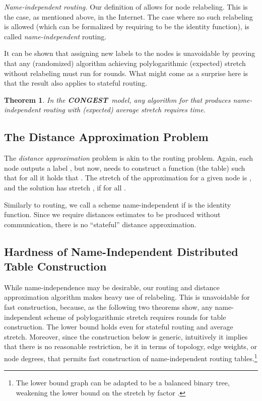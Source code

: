 \documentclass[letterpaper,11pt]{article}
\newtheorem{theorem}{Theorem}[section]
\newcommand{\CONGEST}{\textbf{CONGEST}}
\begin{document}
\emph{Name-independent routing.} Our definition of  allows for node
relabeling. This is the case, as mentioned above, in the Internet. The case
where no such relabeling is allowed (which can be formalized by requiring
 to be the identity function), is called \emph{name-independent}
routing.

It can be shown that assigning new labels to the nodes is unavoidable by proving
that any (randomized) algorithm achieving polylogarithmic (expected) stretch
without relabeling must run for  rounds. What might come as a
surprise here is that the result also applies to stateful routing.
\begin{theorem}
In the \CONGEST\ model, any algorithm for  that produces
name-independent routing with (expected) average stretch  requires
 time.
\end{theorem}



\subsection{The Distance Approximation Problem}

The \emph{distance approximation} problem is akin to the routing problem. Again,
each node  outputs a label , but now,  needs to construct a
function  (the table) such that for all
 it holds that . The stretch of the
approximation for a given node  is , and the
solution has stretch , if  for
all .

Similarly to routing, we call a scheme name-independent if 
is the identity function. Since we require distances estimates to be
produced without communication, there is no ``stateful'' distance
approximation.

\subsection{Hardness of Name-Independent Distributed Table Construction}
\label{sec:naming}


While name-independence may be desirable, our routing and distance approximation
algorithm makes heavy use of relabeling. This is unavoidable for fast
construction, because, as the following two theorems show, any name-independent
scheme of polylogarithmic stretch requires  rounds for table
construction. The lower bound holds even for stateful routing 
and average stretch. Moreover, since the construction below is generic,
intuitively it implies that there is no reasonable restriction, be it
in terms of topology, edge weights, or node degrees, that permits fast
construction of name-independent routing tables.\footnote{The lower bound graph can be adapted to be a balanced binary
  tree, weakening the lower bound on the stretch by factor .}
\end{document}

